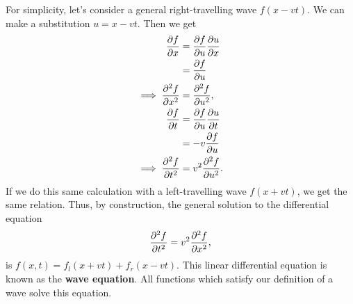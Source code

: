 \documentclass[../classical_mechanics.tex]{subfiles}
\begin{document}
        For simplicity, let's consider a general right-travelling wave $f(x-vt)$. We can make a substitution $u=x-vt$.
        Then we get
        \begin{align}
            \pdv{f}{x}&=\pdv{f}{u}\pdv{u}{x}\\
            &=\pdv{f}{u}\\
            \implies\pdv[2]{f}{x}&=\pdv[2]{f}{u},\\
            \pdv{f}{t}&=\pdv{f}{u}\pdv{u}{t}\\
            &=-v\pdv{f}{u}\\
            \implies\pdv[2]{f}{t}&=v^2\pdv[2]{f}{u}.
        \end{align}
        If we do this same calculation with a left-travelling wave $f(x+vt)$, we get the same relation.
        Thus, by construction, the general solution to the differential equation
        \begin{equation}
            \pdv[2]{f}{t}=v^2\pdv[2]{f}{x},
        \end{equation}
        is $f(x,t)=f_l(x+vt)+f_r(x-vt)$.
        This linear differential equation is known as the \textbf{wave equation}.
        All functions which satisfy our definition of a wave solve this equation.
\end{document}
